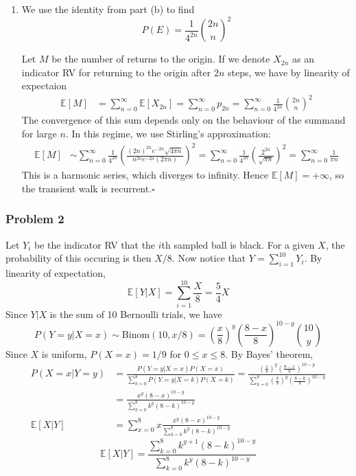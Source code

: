 \documentclass[letterpaper,12pt]{article}
\renewcommand*{\qed}{\hfill\ensuremath{\square}}
\newcommand*{\Binom}[2]{\text{Binom}\left(#1, #2\right)}
\newcommand*{\erv}[1]{\mathbb{E}\left[#1\right]}
\begin{document}
\begin{flushleft}
\begin{enumerate}[label=(\alph*)]
        \item
        We use the identity from part (b) to find
        $$P(E) = \frac{1}{4^{2n}}\binom{2n}{n}^2$$

        Let $M$ be the number of returns to the origin. If we denote $X_{2n}$ as an indicator RV for returning to the origin after $2n$ steps, we have by linearity of expectaion
        \begin{align*}
            \erv{M} &= \sum_{n=0}^\infty \erv{X_{2n}} = \sum_{n=0}^\infty p_{2n} = \sum_{n=0}^\infty \frac{1}{4^{2n}}\binom{2n}{n}^2
        \end{align*}
        The convergence of this sum depends only on the behaviour of the summand for large $n$. In this regime, we use Stirling's approximation:
        \begin{align*}
            \erv{M} &\sim \sum_{n=0}^\infty \frac{1}{4^{2n}} \left(\frac{(2n)^{2n} e^{-2n} \sqrt{4\pi n}}{n^{2n} e^{-2n} (2\pi n)}\right)^2 = \sum_{n=0}^\infty \frac{1}{4^{2n}} \left(\frac{2^{2n}}{\sqrt{\pi n}}\right)^2 = \sum_{n=0}^\infty \frac{1}{\pi n}
        \end{align*}
        This is a harmonic series, which diverges to infinity. Hence $\erv{M} = +\infty$, so the transient walk is recurrent.\qed

    \end{enumerate}

    \subsubsection*{Problem 2}
    Let $Y_i$ be the indicator RV that the $i$th sampled ball is black. For a given $X$, the probability of this occuring is then $X/8$. Now notice that $Y = \sum_{i=1}^10 Y_i$. By linearity of expectation,
    $$\boxed{\erv{Y | X} = \sum_{i=1}^{10} \frac{X}{8} = \frac{5}{4}X}$$
    Since $Y|X$ is the sum of 10 Bernoulli trials, we have
    $$P(Y = y|X = x) \sim \Binom{10}{x/8} = \left(\frac{x}{8}\right)^y \left(\frac{8 - x}{8}\right)^{10 - y} \binom{10}{y}$$
    Since $X$ is uniform, $P(X = x) = 1/9$ for $0 \leq x \leq 8$. By Bayes' theorem,
    \begin{align*}
        P(X = x | Y = y) &= \frac{P(Y = y|X = x)P(X = x)}{\sum_{k=0}^8 P(Y = y|X = k) P(X = k)} = \frac{\left(\frac{x}{8}\right)^y \left(\frac{8 - x}{8}\right)^{10 - y}}{\sum_{k=0}^8 \left(\frac{k}{8}\right)^y \left(\frac{8 - k}{8}\right)^{10 - y}} \\
        &= \frac{x^y (8 - x)^{10 - y}}{\sum_{k=0}^8 k^y (8 - k)^{10 - y}} \\
        \erv{X|Y} &= \sum_{x=0}^8 x\frac{x^y (8 - x)^{10 - y}}{\sum_{k=0}^8 k^y (8 - k)^{10 - y}}
    \end{align*}
    $$\boxed{\erv{X|Y} = \frac{\sum_{k=0}^8 k^{y+1} (8 - k)^{10 - y}}{\sum_{k=0}^8 k^y (8 - k)^{10 - y}}}$$

\end{flushleft}
\end{document}
